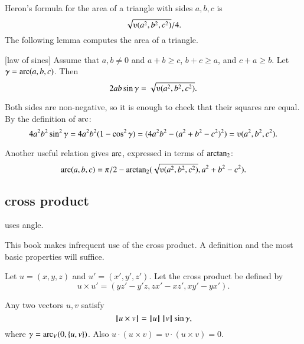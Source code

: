Heron's formula for the area of 
a triangle with sides $a,b,c$ is $$\sqrt{\ups(a^2,b^2,c^2)}/4.$$  
The following
lemma  computes the area of a triangle.  

\begin{lemma}[law of sines]
Assume that $a,b\ne 0$ and $a+b\ge c$, $b+c\ge a$, and $c+a\ge b$.
Let $\gamma=\operatorname{arc}(a,b,c)$.  Then
        $$2 a b \sin\gamma = \sqrt{\ups(a^2,b^2,c^2)}.$$
\end{lemma}
\begin{proved}
Both sides are non-negative, so it is enough to check
that their squares are equal.  By the definition of $\operatorname{arc}$:
      $$4 a^2 b^2 \sin^2\gamma = 4 a^2 b^2 (1-\cos^2\gamma) = (4 a^2 b^2 - (a^2 + b^2 -
      c^2)^2) = \ups(a^2,b^2,c^2).$$
\swallowed\end{proved}

Another useful relation gives $\operatorname{arc}$, expressed in terms of ${\operatorname{arctan_2}}$:
  $$
  \arc(a,b,c) = 
    \pi/2 - \atn({\sqrt{\ups(a^2,b^2,c^2)}},{ a^2 + b^2 - c^2}).
    $$



\subsection{cross product} uses angle.

This book makes infrequent use of the cross product.
A definition and the most basic properties will suffice.

\begin{definition}   Let $u =(x,y,z)$ and $u' = (x',y',z')$.  
Let the cross product be defined
by
    $$
    u \times u' = (y z' - y' z, z x' - x z', x y' - y x').
    $$
\end{definition}

\begin{lemma}  
Any two vectors $u,v$ satisfy
    $${{\hskip0.1em|\hskip-0.15em|\hskip0.1em}u \times v{\hskip0.1em|\hskip-0.15em|\hskip0.1em}} = {{\hskip0.1em|\hskip-0.15em|\hskip0.1em}u{\hskip0.1em|\hskip-0.15em|\hskip0.1em}}\,{{\hskip0.1em|\hskip-0.15em|\hskip0.1em}v{\hskip0.1em|\hskip-0.15em|\hskip0.1em}}\sin\gamma,$$
where $\gamma=\operatorname{arc}_V(0,\{u,v\})$.
Also $u \cdot (u\times v) = v\cdot (u\times v) = 0$.
\end{lemma}

